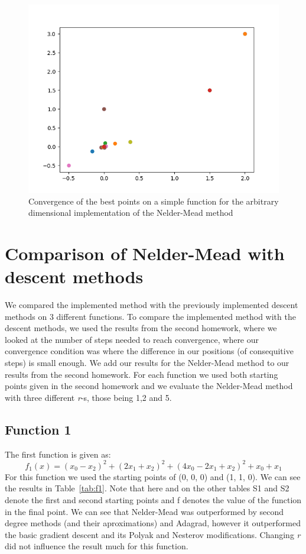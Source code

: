 \documentclass[9pt]{IEEEtran}
\begin{document}
\begin{figure}[h]
    \includegraphics[width=\columnwidth]{convergence1.png}
    \caption{Convergence of the best points on a simple function 
    for the arbitrary dimensional implementation of the Nelder-Mead method}
    \label{fig:nelder}
\end{figure}

\section{Comparison of Nelder-Mead with descent methods}
We compared the implemented method with the previously implemented descent 
methods on 3 different functions. To compare the implemented method with the descent 
methods, we used the results from the second homework, where we looked at the number 
of steps needed to reach convergence, where our convergence condition was 
where the difference in our
positions (of consequitive steps) is small enough. We add our results for 
the Nelder-Mead method to our results from the second homework. For each function 
we used both starting points given in the second homework
 and we evaluate the Nelder-Mead method with three 
different \textit{r}-s, those being 1,2 and 5.

\subsection*{Function 1}
The first function is given as:
\[
f_1(x) = (x_0 - x_2)^2 + (2x_1 + x_2)^2 + (4x_0 - 2x_1 + x_2)^2 + x_0 + x_1
\]
For this function we used the starting points of (0, 0, 0) and (1, 1, 0).
We can see the results in Table~\ref{tab:f1}. Note that here and on the other tables
S1 and S2 denote the first and second starting points and f denotes the value of 
the function in the final point. We can see that 
Nelder-Mead was outperformed by second degree methods (and their aproximations) and 
Adagrad, however it outperformed the basic gradient descent and its Polyak and 
Nesterov modifications. Changing \textit{r} did not influence the result much 
for this function.
\end{document}
